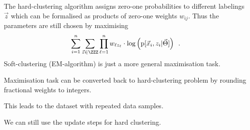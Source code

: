 \documentclass[landscape,footrule]{foils}
\newcommand{\pd}[1]{\mathrm{p}[#1]}
\begin{document}

The hard-clustering algorithm assigns zero-one probabilities to different labelings $\vec{z}$ which can be formalised as products of zero-one weights $w_{ij}$. Thus the parameters are still chosen by maximising
\begin{align*}
\sum_{i=1}^n \sum_{\vec{z}\in\ZZZ}\prod_{\ell=1}^n w_{\ell z_\ell}\cdot\log\left(\pd{\vec{x}_i,z_i|\vec{\Theta}}\right)
\enspace.
\end{align*}
Soft-clustering (EM-algorithm) is just a more general maximisation task.

Maximisation task can be converted back to hard-clustering problem by rounding fractional weights to integers.
\begin{triangles}
\item This leads to the dataset with repeated data samples. 
\item We can still use the update steps for hard clustering.
\end{triangles}
\end{document}
